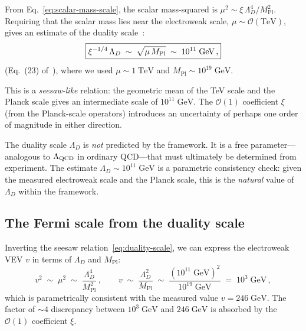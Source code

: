 \documentclass[11pt,a4paper]{article}
\begin{document}
From Eq.~\eqref{eq:scalar-mass-scale}, the scalar mass-squared is
$\mu^2 \sim \xi \,\Lambda_D^4 / M_{\text{Pl}}^2$.  Requiring that the
scalar mass lies near the electroweak scale,
$\mu \sim \mathcal{O}(\text{TeV})$, gives an estimate of the duality
scale~\cite{CacciapagliaSannino2024}:
\begin{equation}\label{eq:duality-scale}
  \boxed{%
  \xi^{-1/4}\, \Lambda_D
  \;\sim\; \sqrt{\mu\, M_{\text{Pl}}}
  \;\sim\; 10^{11}\;\text{GeV}\,,}
\end{equation}
(Eq.~(23) of~\cite{CacciapagliaSannino2024}), where we used
$\mu \sim 1\;\text{TeV}$ and
$M_{\text{Pl}} \sim 10^{19}\;\text{GeV}$.

This is a \emph{seesaw-like} relation: the geometric mean of the TeV
scale and the Planck scale gives an intermediate scale of
$10^{11}\;\text{GeV}$.  The $\mathcal{O}(1)$ coefficient $\xi$ (from
the Planck-scale operators) introduces an uncertainty of perhaps one
order of magnitude in either direction.

\begin{remark}
  The duality scale $\Lambda_D$ is \emph{not} predicted by the
  framework.  It is a free parameter---analogous to
  $\Lambda_{\mathrm{QCD}}$ in ordinary QCD---that must ultimately be determined
  from experiment.  The estimate $\Lambda_D \sim 10^{11}\;\text{GeV}$
  is a parametric consistency check: given the measured electroweak
  scale and the Planck scale, this is the \emph{natural} value of
  $\Lambda_D$ within the framework.
\end{remark}

\subsection{The Fermi scale from the duality scale}

Inverting the seesaw relation~\eqref{eq:duality-scale}, we can express
the electroweak VEV $v$ in terms of $\Lambda_D$ and $M_{\text{Pl}}$:
\begin{equation}\label{eq:fermi-scale}
  v^2 \;\sim\; \mu^2
  \;\sim\; \frac{\Lambda_D^4}{M_{\text{Pl}}^2}\,,
  \qquad
  v \;\sim\; \frac{\Lambda_D^2}{M_{\text{Pl}}}
  \;\sim\; \frac{(10^{11}\;\text{GeV})^2}{10^{19}\;\text{GeV}}
  \;=\; 10^3\;\text{GeV}\,,
\end{equation}
which is parametrically consistent with the measured value
$v = 246\;\text{GeV}$.  The factor of $\sim 4$ discrepancy between
$10^3\;\text{GeV}$ and $246\;\text{GeV}$ is absorbed by the
$\mathcal{O}(1)$ coefficient $\xi$.
\end{document}
